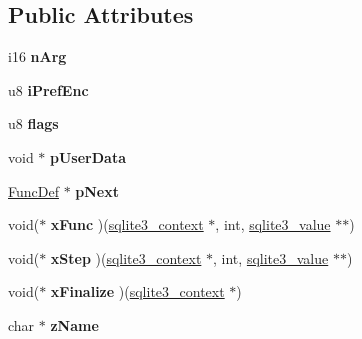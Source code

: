 \subsection*{Public Attributes}
\begin{DoxyCompactItemize}
\item 
\hypertarget{struct_func_def_a4ad90c05868ec8ee60c211b6e20299df}{i16 {\bfseries n\-Arg}}\label{struct_func_def_a4ad90c05868ec8ee60c211b6e20299df}

\item 
\hypertarget{struct_func_def_aa7ed0a0a7d8790a4946ef0dbf85a601c}{u8 {\bfseries i\-Pref\-Enc}}\label{struct_func_def_aa7ed0a0a7d8790a4946ef0dbf85a601c}

\item 
\hypertarget{struct_func_def_aed4dc88e58b7582668bcaf425c4d053f}{u8 {\bfseries flags}}\label{struct_func_def_aed4dc88e58b7582668bcaf425c4d053f}

\item 
\hypertarget{struct_func_def_a04fdde2f96be198823a483bebcfd3ae3}{void $\ast$ {\bfseries p\-User\-Data}}\label{struct_func_def_a04fdde2f96be198823a483bebcfd3ae3}

\item 
\hypertarget{struct_func_def_a1ebe547d000172d9ae44d12eeb433a48}{\hyperlink{struct_func_def}{Func\-Def} $\ast$ {\bfseries p\-Next}}\label{struct_func_def_a1ebe547d000172d9ae44d12eeb433a48}

\item 
\hypertarget{struct_func_def_a1cfd07fdfe22ff504ea7f36c0752c1da}{void($\ast$ {\bfseries x\-Func} )(\hyperlink{structsqlite3__context}{sqlite3\-\_\-context} $\ast$, int, \hyperlink{struct_mem}{sqlite3\-\_\-value} $\ast$$\ast$)}\label{struct_func_def_a1cfd07fdfe22ff504ea7f36c0752c1da}

\item 
\hypertarget{struct_func_def_ab1d1c623844534b17ea3ccce3f815464}{void($\ast$ {\bfseries x\-Step} )(\hyperlink{structsqlite3__context}{sqlite3\-\_\-context} $\ast$, int, \hyperlink{struct_mem}{sqlite3\-\_\-value} $\ast$$\ast$)}\label{struct_func_def_ab1d1c623844534b17ea3ccce3f815464}

\item 
\hypertarget{struct_func_def_a3c649453d5a58c697b7ee54ee999e7ef}{void($\ast$ {\bfseries x\-Finalize} )(\hyperlink{structsqlite3__context}{sqlite3\-\_\-context} $\ast$)}\label{struct_func_def_a3c649453d5a58c697b7ee54ee999e7ef}

\item 
\hypertarget{struct_func_def_a1135e622a3a505c7c463e975846ef926}{char $\ast$ {\bfseries z\-Name}}\label{struct_func_def_a1135e622a3a505c7c463e975846ef926}


\end{DoxyCompactItemize}
